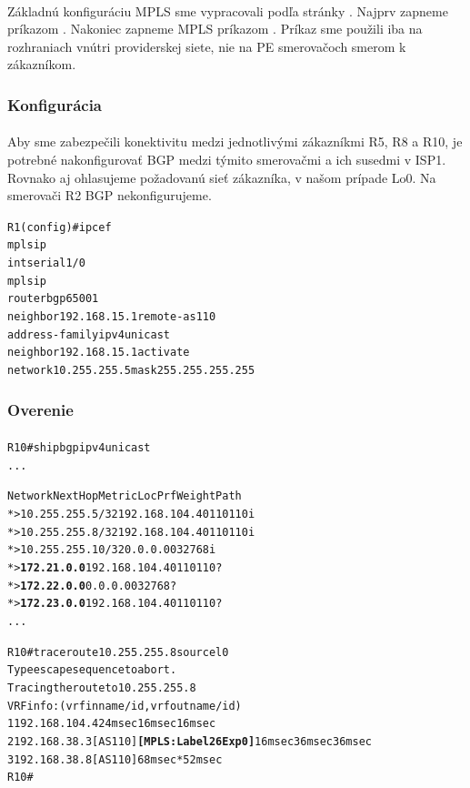 \documentclass[12pt,twoside,a4paper]{report}
\begin{document}
\paragraph{}
Základnú konfiguráciu MPLS sme vypracovali podľa stránky . Najprv zapneme  príkazom . Nakoniec zapneme MPLS príkazom . Príkaz  sme použili iba na rozhraniach vnútri providerskej siete, nie na PE smerovačoch smerom k zákazníkom.

\subsubsection{Konfigurácia}
\paragraph{}
Aby sme zabezpečili konektivitu medzi jednotlivými zákazníkmi R5, R8 a R10, je potrebné nakonfigurovať BGP medzi týmito smerovačmi a ich susedmi v ISP1. Rovnako aj ohlasujeme požadovanú sieť zákazníka, v našom prípade Lo0. Na smerovači R2 BGP nekonfigurujeme.

\noindent
{\selectfont
\begin{small}
\begin{alltt}
R1 (config)#ip cef
mpls ip
int serial1/0
  mpls ip
router bgp 65001
  neighbor 192.168.15.1 remote-as 110
  address-family ipv4 unicast
  neighbor 192.168.15.1 activate
  network 10.255.255.5 mask 255.255.255.255
\end{alltt}
\end{small}
}

\subsubsection{Overenie}
\paragraph{}
\noindent
{\selectfont
\begin{small}
\begin{alltt}
R10#sh ip bgp ipv4 unicast
...

     Network          Next Hop            Metric LocPrf Weight Path
 *>  10.255.255.5/32  192.168.104.4                          0 110 110 i
 *>  10.255.255.8/32  192.168.104.4                          0 110 110 i
 *>  10.255.255.10/32 0.0.0.0                  0         32768 i
 *>  \textbf{172.21.0.0}       192.168.104.4                          0 110 110 ?
 *>  \textbf{172.22.0.0}       0.0.0.0                  0         32768 ?
 *>  \textbf{172.23.0.0}       192.168.104.4                          0 110 110 ?
...




R10#traceroute 10.255.255.8 source l0
Type escape sequence to abort.
Tracing the route to 10.255.255.8
VRF info: (vrf in name/id, vrf out name/id)
  1 192.168.104.4 24 msec 16 msec 16 msec
  2 192.168.38.3 [AS 110] \textbf{[MPLS: Label 26 Exp 0]} 16 msec 36 msec 36 msec
  3 192.168.38.8 [AS 110] 68 msec *  52 msec
R10#

\end{alltt}
\end{small}
}
\end{document}
